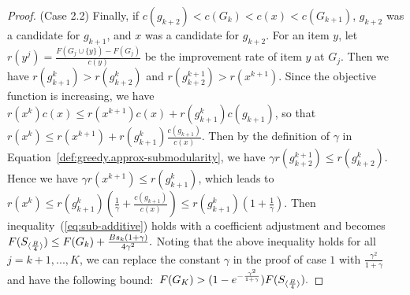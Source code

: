 \begin{proof}
(Case 2.2) 
Finally, if \mbox{$c(g_{k+2}) < c(G_k) < c(x) < c(G_{k+1})$},
$g_{k+2}$ was a candidate for $g_{k+1}$, and $x$ was a candidate for 
$g_{k+2}$. 
For an item $y$, let 
\mbox{$r(y^j)= \frac{F(G_{j} \cup \{ y \}) - F(G_j)}{c(y)}$} 
be the improvement rate of item $y$ at $G_j$. 
Then we have \mbox{$r(g_{k+1}^k) > r(g_{k+2}^k)$} and \mbox{$r(g_{k+2}^{k+1}) > r(x^{k+1})$}. 
Since the objective function is increasing, we have \\
\mbox{$r(x^k) c(x) \leq r(x^{k+1})c(x) + r(g_{k+1}^k)c(g_{k+1})$},
so that 
\mbox{$r(x^k) \leq r(x^{k+1}) + r(g_{k+1}^k) \frac{c(g_{k+1})}{c(x)}$}.
Then by the definition of $\gamma$ in Equation~\ref{def:greedy.approx-submodularity}, we have 
$ \gamma r(g^{k+1}_{k+2}) \leq r(g_{k+2}^k)$. Hence we have 
$ \gamma r(x^{k+1}) \leq  r(g_{k+1}^k)$, which leads to 
\mbox{$r (x^k) \leq r(g_{k+1}^k) (\frac{1}{\gamma} + \frac{c(g_{k+1})}{c(x)} ) \leq r(g_{k+1}^k) (1 + \frac{1}{\gamma})$}. Then
inequality~(\ref{eq:sub-additive}) holds with a coefficient adjustment and becomes
$
F(S_{\langle \frac{B}{4} \rangle}) \leq F(G_k) + \frac{B s_k (1+\gamma)}{4 \gamma^2}.
$
Noting that the above inequality holds for all $j=k+1, ..., K$, we can replace the constant $\gamma$ in the 
proof of case $1$ with $\frac{\gamma^2}{1+\gamma}$ and have the following bound:\mbox{
$
F(G_K) > (1 - e^{-\frac{\gamma^2}{1+\gamma} }) F(S_{\langle \frac{B}{4} \rangle}).
$}

\end{proof}
